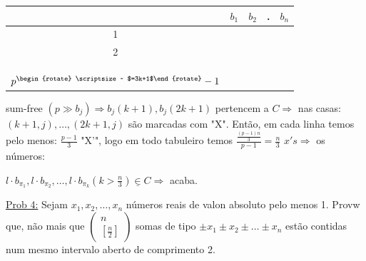 \documentclass[a4paper,12pt]{article}
\theoremstyle{plain} %
\theoremstyle{definition} %
\theoremstyle{remark} %
\newcommand{\rotsupup}[1]{\begin{rotate}{30}\scriptsize ~#1\end{rotate}} %
\begin{document}
\begin{framed}
\begin{multicols}{2}
			
			\begin{tabular}{|c|c|c|cll|c|}
				\hline
				\cellcolor[HTML]{000000}    & $b_1$              & $b_2$              & \multicolumn{3}{c|}{\hspace{3em}.}       & $b_n$              \\ \hline
				1                           &                    &                    & \multicolumn{3}{c|}{}                   &                    \\ \hline
				2                           &                    &                    & \multicolumn{3}{c|}{}                   &                    \\ \hline
				&                    &                    & \multicolumn{3}{c|}{}                   &                    \\
				&                    &                    & \multicolumn{3}{c|}{}                   &                    \\
				\multirow{-3}{*}{}          & \multirow{-3}{*}{} & \multirow{-3}{*}{} & \multicolumn{3}{c|}{\multirow{-3}{*}{}} & \multirow{-3}{*}{} \\ \hline
				$p^{\rotsupup{ $=3k+1$}}-1$ &                    &                    & \multicolumn{3}{c|}{}                   &                    \\ \hline
			\end{tabular}
		\end{multicols}
		
		sum-free $(p\gg b_j)\Rightarrow b_j(k+1), b_j(2k+1)$ pertencem a $C\Rightarrow$ nas casas: $(k+1, j), \dotso, (2k+1, j)$ s\~ao marcadas com "X". Ent\~ao, em cada linha temos pelo menos: $\frac{p-1}{3}$ "X'", logo em todo tabuleiro temos $\frac{\frac{(p-1)n}{3}}{p-1}=\frac{n}{3}$ $x's\Rightarrow$ os n\'umeros: 
		
		$l\cdot b_{\pi_1}, l\cdot b_{\pi_2}, \dotso, l\cdot b_{\pi_k} (k>\frac{n}{3}) \underline{\in} C\Rightarrow$ acaba. \tiny\textblock 
	\end{framed}
	
	\normalsize 
	
	\vspace{2ex}\underline{Prob 4:} Sejam $x_1, x_2,\dotso, x_n$ n\'umeros reais de valon absoluto pelo menos 1. Provw que, n\~ao mais que $\left(\begin{smallmatrix}
		n\\
		\left[\frac{n}{2}\right]
	\end{smallmatrix}\right)$ somas de tipo $\pm x_1\pm x_2\pm\dotso\pm x_n$ est\~ao contidas num mesmo intervalo aberto de comprimento 2.
	
\end{document}
